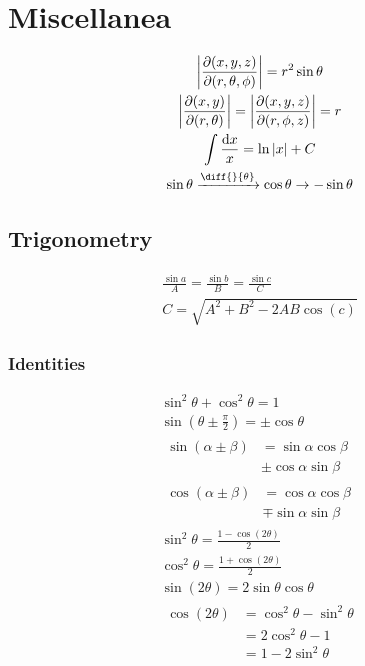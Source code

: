 \documentclass[tbtags]{cheatsheet}
\begin{document}
	\section{Miscellanea}	
		\begin{gather*}
			\left|\frac{\partial(x,y,z)}{\partial(r,\theta,\phi)}\right| = r^2 \sin \theta \\
			\left| \frac{\partial(x,y)}{\partial(r,\theta)} \right| = \left| \frac{\partial(x,y,z)}{\partial(r,\phi,z)} \right| = r\\
			\int \frac{\mathrm{d}x}{x} = \ln|x| + C\\
			\sin\theta \xrightarrow{\diff{}{\theta}} \cos\theta \rightarrow -\sin\theta\\
		\end{gather*}
	\subsection{Trigonometry}
		\begin{gather*}
			\frac{\sin a}{A} = \frac{\sin b}{B} = \frac{\sin c}{C}	\tag{law of sines}\\
			C = \sqrt{A^2 + B^2 - 2AB\cos(c)}	\tag{law of cosines}
		\end{gather*}
		\subsubsection{Identities}
			\begin{gather*}
				\sin^2\theta + \cos^2\theta = 1\\
				\sin(\theta \pm \frac{\pi}{2}) = \pm\cos\theta\\
				\begin{split}
					\sin(\alpha \pm \beta) &= \sin\alpha\cos\beta\\
					 &\pm \cos\alpha\sin\beta
				\end{split}\\
				\begin{split}
					\cos(\alpha \pm \beta) &= \cos\alpha\cos\beta \\
					&\mp \sin\alpha\sin\beta
				\end{split}\\
				\sin^2 \theta = \frac{1-\cos(2\theta)}{2}\\
				\cos^2 \theta = \frac{1+\cos(2\theta)}{2}\\
				\sin(2\theta) = 2\sin\theta\cos\theta\\
				\begin{split}
					\cos(2\theta) &= \cos^2\theta - \sin^2\theta\\
					&= 2\cos^2\theta - 1\\
					&= 1 - 2\sin^2\theta
				\end{split}
			\end{gather*}
\end{document}
